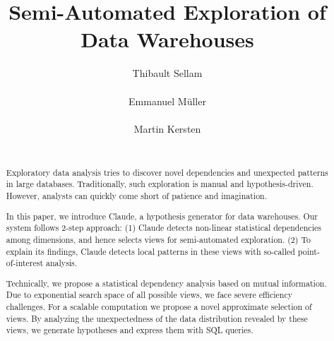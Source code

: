\documentclass{sig-alternate}
\begin{document}
\title{Semi-Automated Exploration of Data Warehouses}


\author{
\alignauthor
Thibault Sellam\\
       \\
\alignauthor
Emmanuel M\"uller\\
       \\
\alignauthor
Martin Kersten\\
       \\
}

\maketitle

\begin{abstract}
Exploratory data analysis tries to discover novel dependencies and unexpected
patterns in large databases. Traditionally, such exploration is manual and
hypothesis-driven. However, analysts can quickly come short of patience and imagination.

In this paper, we introduce Claude, a hypothesis generator for data warehouses.
Our system follows 2-step approach: (1) Claude detects non-linear
statistical dependencies among dimensions, and hence selects views for
semi-automated exploration. (2) To explain its findings, Claude detects local
patterns in these views with so-called point-of-interest analysis.

Technically, we propose a statistical dependency analysis based on mutual
information. Due to exponential search space of all possible views, we face
severe efficiency challenges. For a scalable computation we propose a novel
approximate selection of views. By analyzing the unexpectedness of the data
distribution revealed by these views, we generate hypotheses and express them
with SQL queries.
\end{abstract}





\balancecolumns
\end{document}
